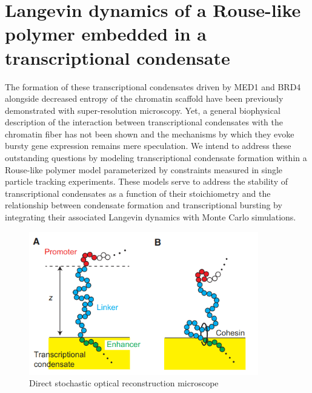 \documentclass{article}
\begin{document}
\section{Langevin dynamics of a Rouse-like polymer embedded in a transcriptional condensate}

The formation of these transcriptional condensates driven by MED1 and BRD4 alongside decreased entropy of the chromatin scaffold have been previously demonstrated with super-resolution microscopy. Yet, a general biophysical description of the interaction between transcriptional condensates with the chromatin fiber has not been shown and the mechanisms by which they evoke bursty gene expression remains mere speculation. We intend to address these outstanding questions by modeling transcriptional condensate formation within a Rouse-like polymer model parameterized by constraints measured in single particle tracking experiments. These models serve to address the stability of transcriptional condensates as a function of their stoichiometry and the relationship between condensate formation and transcriptional bursting by integrating their associated Langevin dynamics with Monte Carlo simulations. 

\clearpage
\begin{figure}
\centering
\includegraphics[width=10cm]{Model.png}
\caption{Direct stochastic optical reconstruction microscope}
\end{figure}





 
\end{document}
